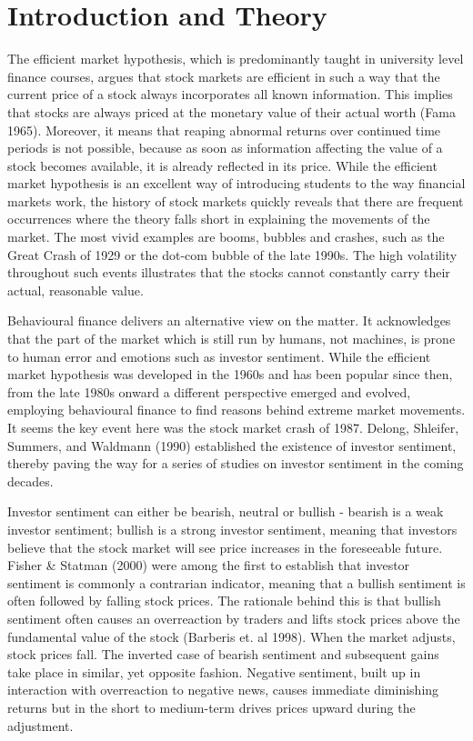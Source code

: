 \section{Introduction and Theory}

The efficient market hypothesis, which is predominantly taught in university level finance courses, argues that stock markets are efficient in such a way that the current price of a stock always incorporates all known information. This implies that stocks are always priced at the monetary value of their actual worth (Fama 1965). Moreover, it means that reaping abnormal returns over continued time periods is not possible, because as soon as information affecting the value of a stock becomes available, it is already reflected in its price. While the efficient market hypothesis is an excellent way of introducing students to the way financial markets work, the history of stock markets quickly reveals that there are frequent occurrences where the theory falls short in explaining the movements of the market. The most vivid examples are booms, bubbles and crashes, such as the Great Crash of 1929 or the dot-com bubble of the late 1990s. The high volatility throughout such events illustrates that the stocks cannot constantly carry their actual, reasonable value. 
\par
Behavioural finance delivers an alternative view on the matter. It acknowledges that the part of the market which is still run by humans, not machines, is prone to human error and emotions such as investor sentiment. While the efficient market hypothesis was developed in the 1960s and has been popular since then, from the late 1980s onward a different perspective emerged and evolved, employing behavioural finance to find reasons behind extreme market movements. It seems the key event here was the stock market crash of 1987.  Delong, Shleifer, Summers, and Waldmann (1990) established the existence of investor sentiment, thereby paving the way for a series of studies on investor sentiment in the coming decades. 
\par
Investor sentiment can either be bearish, neutral or bullish - bearish is a weak investor sentiment; bullish is a strong investor sentiment, meaning that investors believe that the stock market will see price increases in the foreseeable future. Fisher \& Statman (2000) were among the first to establish that investor sentiment is commonly a contrarian indicator, meaning that a bullish sentiment is often followed by falling stock prices. The rationale behind this is that bullish sentiment often causes an overreaction by traders and lifts stock prices above the fundamental value of the stock (Barberis et. al 1998). When the market adjusts, stock prices fall. The inverted case of bearish sentiment and subsequent gains take place in similar, yet opposite fashion. Negative sentiment, built up in interaction with overreaction to negative news, causes immediate diminishing returns but in the short to medium-term drives prices upward during the adjustment.

